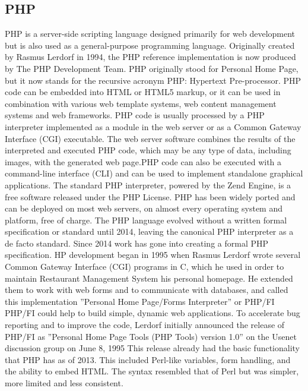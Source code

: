 \subsection{PHP}
PHP is a server-side scripting language designed primarily for web development but is also used as
a general-purpose programming language. Originally created by Rasmus Lerdorf in 1994, the PHP
reference implementation is now produced by The PHP Development Team. PHP originally stood for
Personal Home Page, but it now stands for the recursive acronym PHP: Hypertext Pre-processor.
PHP code can be embedded into HTML or HTML5 markup, or it can be used in combination
with various web template systems, web content management systems and web frameworks. PHP
code is usually processed by a PHP interpreter implemented as a module in the web server or as
a Common Gateway Interface (CGI) executable. The web server software combines the results of
the interpreted and executed PHP code, which may be any type of data, including images, with the
generated web page.PHP code can also be executed with a command-line interface (CLI) and can be
used to implement standalone graphical applications.
The standard PHP interpreter, powered by the Zend Engine, is a free software released under the
PHP License. PHP has been widely ported and can be deployed on most web servers, on almost every
operating system and platform, free of charge. The PHP language evolved without a written formal
specification or standard until 2014, leaving the canonical PHP interpreter as a de facto standard.
Since 2014 work has gone into creating a formal PHP specification. HP development began in 1995
when Rasmus Lerdorf wrote several Common Gateway Interface (CGI) programs in C, which he used
in order to maintain Restaurant Management System his personal homepage. He extended them to
work with web forms and to communicate with databases, and called this implementation ”Personal
Home Page/Forms Interpreter” or PHP/FI
PHP/FI could help to build simple, dynamic web applications. To accelerate bug reporting and to
improve the code, Lerdorf initially announced the release of PHP/FI as ”Personal Home Page Tools
(PHP Tools) version 1.0” on the Usenet discussion group on June 8, 1995 This release already had
the basic functionality that PHP has as of 2013. This included Perl-like variables, form handling, and
the ability to embed HTML. The syntax resembled that of Perl but was simpler, more limited and less
consistent.
